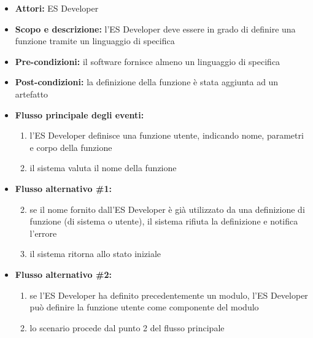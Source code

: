 \begin{itemize}
	\item \textbf{Attori:} ES Developer
	\item \textbf{Scopo e descrizione:} l'ES Developer deve essere in grado di definire una funzione tramite un linguaggio di specifica
	\item \textbf{Pre-condizioni:} il software fornisce almeno un linguaggio di specifica
	\item \textbf{Post-condizioni:} la definizione della funzione è stata aggiunta ad un artefatto
	\item \textbf{Flusso principale degli eventi:}
		\begin{enumerate}
			\item l'ES Developer definisce una funzione utente, indicando nome, parametri e corpo della funzione
			\item il sistema valuta il nome della funzione
		\end{enumerate}
	\item \textbf{Flusso alternativo \#1:}
		\begin{enumerate}
			\setcounter{enumi}{1}
			\item se il nome fornito dall'ES Developer è già utilizzato da una definizione di funzione (di sistema o utente), il sistema rifiuta la definizione e notifica l'errore
			\item il sistema ritorna allo stato iniziale
		\end{enumerate}
	\item \textbf{Flusso alternativo \#2:}
		\begin{enumerate}
			\item se l'ES Developer ha definito precedentemente un modulo, l'ES Developer può definire la funzione utente come componente del modulo
			\item lo scenario procede dal punto 2 del flusso principale
		\end{enumerate}
\end{itemize}

